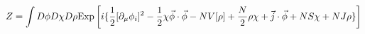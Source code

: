 \begin{equation}
Z = \int D \phi D\chi D \rho{\rm Exp} \left[ i \{  \frac{1}{2} [
\partial_\mu \phi_i ]^2-
\frac{1}{2} \chi {\vec \phi \cdot \vec \phi}- N V[{\rho}] +
\frac{N}{2} \rho \chi +\vec j \cdot \vec \phi + N S \chi + N J
\rho  \} \right] \end{equation}

